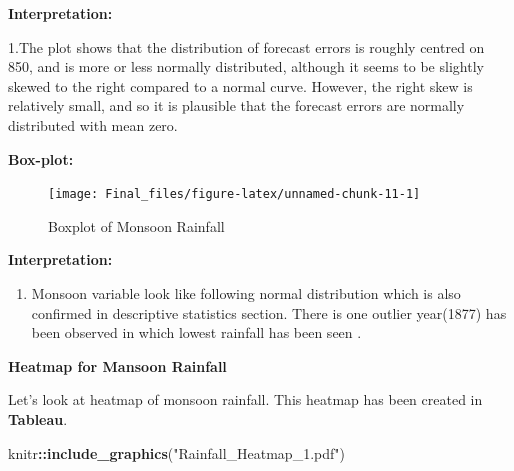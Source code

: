 \documentclass[12pt,openany]{book}
\newenvironment{Shaded}{\begin{snugshade}}{\end{snugshade}}
\newcommand{\DataTypeTok}[1]{\textcolor[rgb]{0.13,0.29,0.53}{#1}}
\newcommand{\KeywordTok}[1]{\textcolor[rgb]{0.13,0.29,0.53}{\textbf{#1}}}
\newcommand{\NormalTok}[1]{#1}
\newcommand{\OperatorTok}[1]{\textcolor[rgb]{0.81,0.36,0.00}{\textbf{#1}}}
\newcommand{\StringTok}[1]{\textcolor[rgb]{0.31,0.60,0.02}{#1}}
\providecommand{\tightlist}{%
  \setlength{\itemsep}{0pt}\setlength{\parskip}{0pt}}
\begin{document}
\textbf{Interpretation:}

1.The plot shows that the distribution of forecast errors is roughly centred on 850, and is more or less normally distributed, although it seems to be slightly skewed to the right compared to a normal curve. However, the right skew is relatively small, and so it is plausible that the forecast errors are normally distributed with mean zero.

\textbf{Box-plot:}

\begin{Shaded}
\end{Shaded}

\begin{figure}

{\centering \texttt{[image: Final\_files/figure-latex/unnamed-chunk-11-1]} 

}

\caption{Boxplot of Monsoon Rainfall}\label{fig:unnamed-chunk-11}
\end{figure}

\textbf{Interpretation:}

\begin{enumerate}
\def\labelenumi{\arabic{enumi}.}
\tightlist
\item
  Monsoon variable look like following normal distribution which is also confirmed in descriptive statistics section. There is one outlier year(1877) has been observed in which lowest rainfall has been seen .
\end{enumerate}

\textbf{Heatmap for Mansoon Rainfall}

Let's look at heatmap of monsoon rainfall. This heatmap has been created in \textbf{Tableau}.

\begin{Shaded}
\begin{Highlighting}[]
\NormalTok{knitr}\OperatorTok{::}\KeywordTok{include_graphics}\NormalTok{(}\StringTok{"Rainfall_Heatmap_1.pdf"}\NormalTok{)}
\end{Highlighting}
\end{Shaded}
\end{document}
